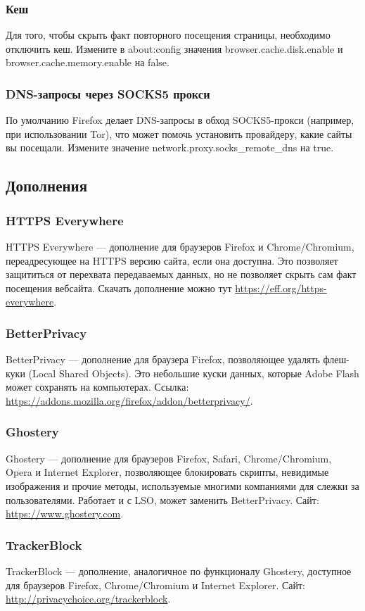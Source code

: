 \subsubsection{Кеш}
Для того, чтобы скрыть факт повторного посещения страницы, необходимо отключить кеш. Измените в about:config значения browser.cache.disk.enable и browser.cache.memory.enable на false.
\subsubsection{DNS-запросы через SOCKS5 прокси}
По умолчанию Firefox делает DNS-запросы в обход SOCKS5-прокси (например, при использовании Tor), что может помочь установить провайдеру, какие сайты вы посещали. Измените значение network.proxy.socks\_remote\_dns на true.
\subsection{Дополнения}
\subsubsection{HTTPS Everywhere}
HTTPS Everywhere --- дополнение для браузеров Firefox и Chrome/Chromium, переадресующее на HTTPS версию сайта, если она доступна. Это позволяет защититься от перехвата передаваемых данных, но не позволяет скрыть сам факт посещения вебсайта. Скачать дополнение можно тут \url{https://eff.org/https-everywhere}.
\subsubsection{BetterPrivacy}
BetterPrivacy --- дополнение для браузера Firefox, позволяющее удалять флеш-куки (Local Shared Objects). Это небольшие куски данных, которые Adobe Flash может сохранять на компьютерах. Ссылка: \url{https://addons.mozilla.org/firefox/addon/betterprivacy/}.
\subsubsection{Ghostery}
Ghostery --- дополнение для браузеров Firefox, Safari, Chrome/Chromium, Opera и Internet Explorer, позволяющее блокировать скрипты, невидимые изображения и прочие методы, используемые многими компаниями для слежки за пользователями. Работает и с LSO, может заменить BetterPrivacy. Сайт: \url{https://www.ghostery.com}.
\subsubsection{TrackerBlock}
TrackerBlock --- дополнение, аналогичное по функционалу Ghostery, доступное для браузеров Firefox, Chrome/Chromium и Internet Explorer. Сайт: \url{http://privacychoice.org/trackerblock}.
